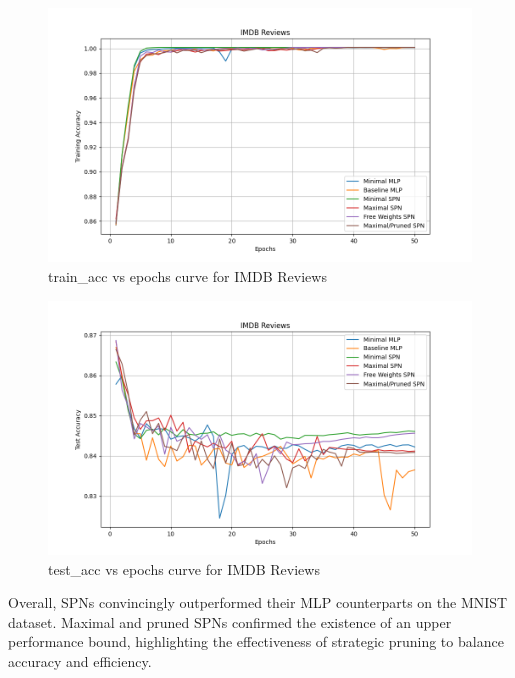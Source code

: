 \begin{figure}[H]
    \centering
    \includegraphics[width=\linewidth]{Figures/Results/IMDB/training_accuracy_plot.png} %
    \captionsetup{width=\linewidth}
    \caption{train\_acc vs epochs curve for IMDB Reviews}
    \label{fig:imdbTrainCurve}
\end{figure}

\begin{figure}[H]
    \centering
    \includegraphics[width=\linewidth]{Figures/Results/IMDB/test_accuracy_plot.png} %
    \captionsetup{width=\linewidth}
    \caption{test\_acc vs epochs curve for IMDB Reviews}
    \label{fig:imdbTestCurve}
\end{figure}

Overall, SPNs convincingly outperformed their MLP counterparts on the MNIST dataset. Maximal and pruned SPNs confirmed the existence of an upper performance bound, highlighting the effectiveness of strategic pruning to balance accuracy and efficiency.

